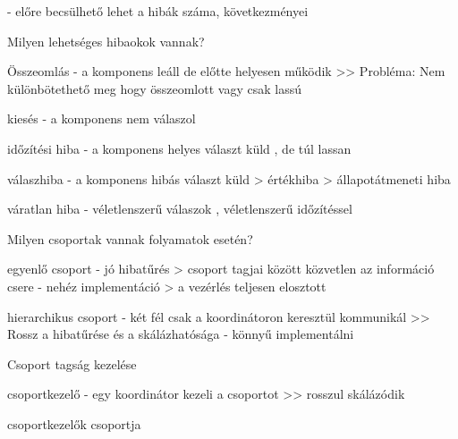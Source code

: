 \documentclass[12pt]{article}
\begin{document}
\begin{description}
                                        - előre becsülhető lehet a hibák száma, következményei
                                    \item  Milyen lehetséges hibaokok vannak?
                                    \item Összeomlás
                                        - a komponens leáll de előtte helyesen működik
                                        >> Probléma: Nem különbötethető meg hogy összeomlott vagy csak lassú 
                                    \item kiesés
                                        - a komponens nem válaszol
                                    \item időzítési hiba
                                        - a komponens helyes választ küld , de túl lassan
                                    \item válaszhiba
                                        - a komponens hibás választ küld
                                        > értékhiba
                                        > állapotátmeneti hiba
                                    \item váratlan hiba
                                        - véletlenszerű válaszok , véletlenszerű időzítéssel
                                    \item  Milyen csoportak vannak folyamatok esetén?
                                    \item egyenlő csoport
                                        - jó hibatűrés
                                        > csoport tagjai között közvetlen az információ csere
                                        - nehéz implementáció
                                        > a vezérlés teljesen elosztott
                                    \item hierarchikus csoport
                                        - két fél csak a koordinátoron keresztül kommunikál
                                        >> Rossz a hibatűrése és a skálázhatósága
                                        - könnyű implementálni
                                    \item  Csoport tagság kezelése
                                    \item csoportkezelő
                                        - egy koordinátor kezeli a csoportot
                                        >> rosszul skálázódik
                                    \item csoportkezelők csoportja

\end{description}
\end{document}
